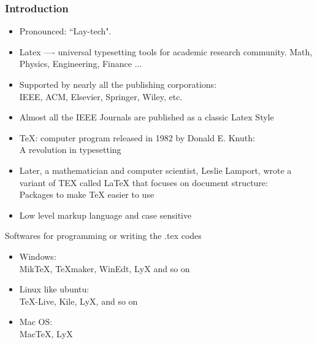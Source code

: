 \documentclass [9pt] {beamer}
\begin{document}
\begin{frame}\frametitle{Introduction}\transblindshorizontal
\rm
\begin{itemize}
\fontsize{8pt}{10pt}\selectfont
\item Pronounced: \textcolor[rgb]{1.00,0.00,0.00}{``Lay-tech"}. \\[.30cm]

\item Latex ---- universal typesetting tools for academic research community. Math, Physics, Engineering, Finance ...\\[.30cm]
\item Supported by nearly all the publishing corporations: \\\textcolor[rgb]{0.98,0.00,0.00}{IEEE, ACM, Elsevier, Springer, Wiley, etc.}\\[.30cm]

\item Almost all the IEEE Journals are published as a classic Latex Style\\[.30cm]

\item TeX: computer program released in 1982 by \textcolor[rgb]{0.98,0.00,0.00}{Donald E. Knuth}:\\
\textcolor[rgb]{1.00,0.00,0.00}{A revolution in typesetting}\\[.30cm]

\item Later, a mathematician and computer scientist, \textcolor[rgb]{0.98,0.00,0.00}{Leslie Lamport}, wrote a variant of TEX called LaTeX that focuses on
document structure:\\
\textcolor[rgb]{0.98,0.00,0.00}{Packages to make TeX easier to use}\\[.30cm]

\item Low level markup language and case sensitive
\end{itemize}
\end{frame}

\begin{frame}{Softwares for programming or writing the .tex codes}
\begin{itemize}
	\item Windows:\\
	MikTeX, TeXmaker, WinEdt, LyX and so on
	\item Linux like ubuntu:\\
	TeX-Live, Kile, LyX, and so on
	\item Mac OS:\\
	MacTeX, LyX
\end{itemize}
\end{frame}
\end{document}

